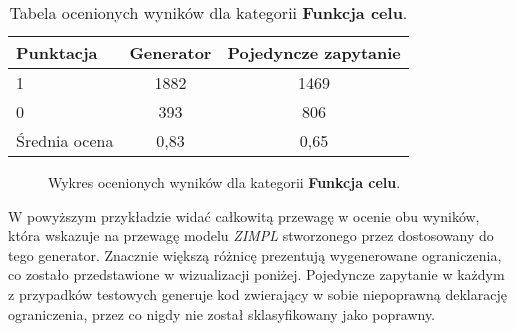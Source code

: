 \begin{table}[ht]
\caption{Tabela ocenionych wyników dla kategorii \textbf{Funkcja celu}.}\label{tab:tabela13}
\centering%
\begin{tabular}{|l|c|c|}
\hline
\textbf{Punktacja} & \textbf{Generator} & \textbf{Pojedyncze zapytanie}\\
\hline
1 & 1882 & 1469 \\
\hline
0 & 393 & 806 \\
\hline
Średnia ocena & 0,83 & 0,65 \\
\hline
\end{tabular}
\end{table}

\begin{figure}[H]
\centering
\begin{minipage}{0.45\textwidth}
\centering
{}
\end{minipage}%
\hspace{0.05\textwidth}
\begin{minipage}{0.45\textwidth}
\centering
{}
\end{minipage}
\caption{Wykres ocenionych wyników dla kategorii \textbf{Funkcja celu}.}
\end{figure}

W powyższym przykładzie widać całkowitą przewagę w ocenie obu wyników, która wskazuje na przewagę modelu  \textit{ZIMPL} stworzonego przez dostosowany do tego generator. Znacznie większą różnicę prezentują wygenerowane ograniczenia, co zostało przedstawione w wizualizacji poniżej. Pojedyncze zapytanie w każdym z przypadków testowych generuje kod zwierający w sobie niepoprawną deklarację ograniczenia, przez co nigdy nie został sklasyfikowany jako poprawny.

